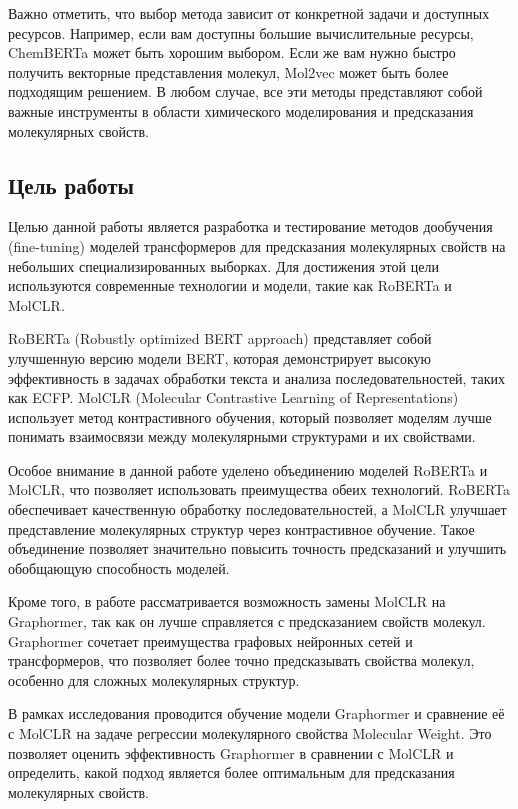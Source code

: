Важно отметить, что выбор метода зависит от конкретной задачи и доступных ресурсов. Например, если вам доступны большие вычислительные ресурсы, ChemBERTa может быть хорошим выбором. Если же вам нужно быстро получить векторные представления молекул, Mol2vec может быть более подходящим решением. В любом случае, все эти методы представляют собой важные инструменты в области химического моделирования и предсказания молекулярных свойств.

\subsection{Цель работы}

Целью данной работы является разработка и тестирование методов дообучения (fine-tuning) моделей трансформеров для предсказания молекулярных свойств на небольших специализированных выборках. Для достижения этой цели используются современные технологии и модели, такие как RoBERTa и MolCLR.

RoBERTa (Robustly optimized BERT approach) \cite{liu2019roberta} представляет собой улучшенную версию модели BERT, которая демонстрирует высокую эффективность в задачах обработки текста и анализа последовательностей, таких как ECFP. MolCLR (Molecular Contrastive Learning of Representations) \cite{molclr} использует метод контрастивного обучения, который позволяет моделям лучше понимать взаимосвязи между молекулярными структурами и их свойствами.

Особое внимание в данной работе уделено объединению моделей RoBERTa и MolCLR, что позволяет использовать преимущества обеих технологий. RoBERTa обеспечивает качественную обработку последовательностей, а MolCLR улучшает представление молекулярных структур через контрастивное обучение. Такое объединение позволяет значительно повысить точность предсказаний и улучшить обобщающую способность моделей.

Кроме того, в работе рассматривается возможность замены MolCLR на Graphormer, так как он лучше справляется с предсказанием свойств молекул. Graphormer сочетает преимущества графовых нейронных сетей и трансформеров, что позволяет более точно предсказывать свойства молекул, особенно для сложных молекулярных структур.

В рамках исследования проводится обучение модели Graphormer и сравнение её с MolCLR на задаче регрессии молекулярного свойства Molecular Weight. Это позволяет оценить эффективность Graphormer в сравнении с MolCLR и определить, какой подход является более оптимальным для предсказания молекулярных свойств.

